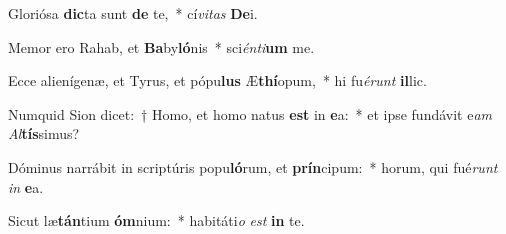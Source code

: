 \item Gloriósa \textbf{dic}ta sunt \textbf{de} te,~* cí\textit{vi}\textit{tas} \textbf{De}i.
\item Memor ero Rahab, et \textbf{Ba}by\textbf{ló}nis~* sci\textit{én}\textit{ti}\textbf{um} me.
\item Ecce alienígenæ, et Tyrus, et pópu\textbf{lus} Æ\textbf{thí}opum,~* hi fu\textit{é}\textit{runt} \textbf{il}lic.
\item Numquid Sion dicet:~† Homo, et homo natus \textbf{est} in \textbf{e}a:~* et ipse fundávit e\textit{am} \textit{Al}\textbf{tís}simus?
\item Dóminus narrábit in scriptúris popu\textbf{ló}rum, et \textbf{prín}cipum:~* horum, qui fué\textit{runt} \textit{in} \textbf{e}a.
\item Sicut læ\textbf{tán}tium \textbf{óm}nium:~* habitáti\textit{o} \textit{est} \textbf{in} te.
